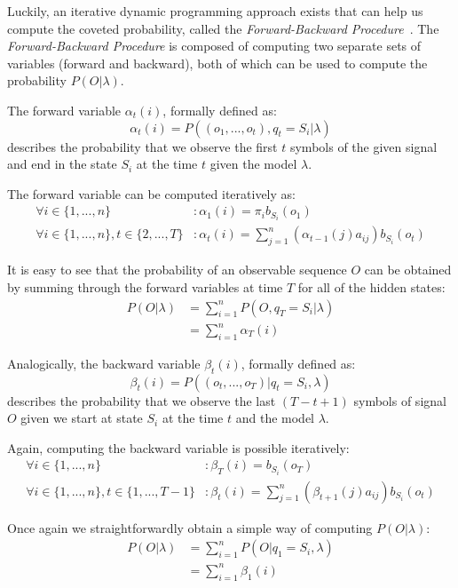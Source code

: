 Luckily, an iterative dynamic programming approach exists that can help us compute the coveted probability, called the \emph{Forward-Backward Procedure}~\cite{baum1967, baum1968}. The \emph{Forward-Backward Procedure} is composed of computing two separate sets of variables (forward and backward), both of which can be used to compute the probability $P(O|\lambda)$.

The forward variable $\alpha_t(i)$, formally defined as: $$\alpha_t(i)=P((o_1, ..., o_t), q_t=S_i|\lambda)$$ describes the probability that we observe the first $t$ symbols of the given signal and end in the state $S_i$ at the time $t$ given the model $\lambda$.

The forward variable can be computed iteratively as:
\begin{align*}
\forall i\in \{1, ..., n\}&: \alpha_1(i)=\pi_ib_{S_i}(o_1)\\
\forall i\in \{1, ..., n\}, t\in\{2, ..., T\}&: \alpha_t(i) = \sum_{j=1}^n{(\alpha_{t-1}(j)a_{ij})}b_{S_i}(o_t)
\end{align*}

It is easy to see that the probability of an observable sequence $O$ can be obtained by summing through the forward variables at time $T$ for all of the hidden states:
\begin{align*}
P(O|\lambda) &= \sum_{i=1}^n{P(O, q_T=S_i|\lambda)}\\
&= \sum_{i=1}^n{\alpha_T(i)}
\end{align*}

Analogically, the backward variable $\beta_t(i)$, formally defined as: $$\beta_t(i)=P((o_t, ..., o_T)| q_t=S_i, \lambda)$$ describes the probability that we observe the last $(T-t+1)$ symbols of signal $O$ given we start at state $S_i$ at the time $t$ and the model $\lambda$.

Again, computing the backward variable is possible iteratively:
\begin{align*}
\forall i\in \{1, ..., n\}&:\beta_T(i)=b_{S_i}(o_T)\\
\forall i\in\{1, ..., n\}, t\in\{1, ..., T-1\}&:\beta_t(i)=\sum_{j=1}^n{(\beta_{t+1}(j)a_{ij})}b_{S_i}(o_t)
\end{align*}

Once again we straightforwardly obtain a simple way of computing $P(O|\lambda)$:
\begin{align*}
P(O|\lambda) &= \sum_{i=1}^n{P(O|q_1=S_i, \lambda)}\\
&= \sum_{i=1}^n{\beta_1(i)}
\end{align*}

